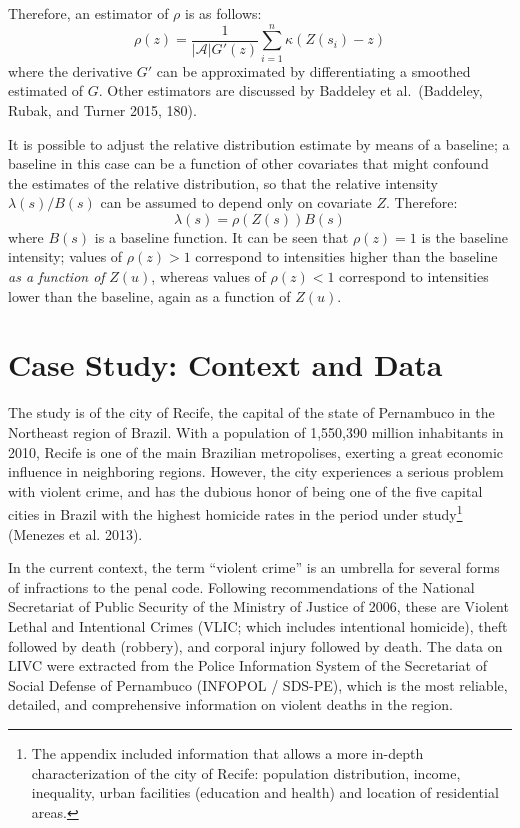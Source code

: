 \documentclass[smallextended]{svjour3}       %
\begin{document}
Therefore, an estimator of \(\rho\) is as follows: \[
\rho(z) = \frac{1}{|\mathcal{A}|G'(z)}\sum_{i=1}^n\kappa(Z(s_i) - z)
\] where the derivative \(G'\) can be approximated by differentiating a
smoothed estimated of \(G\). Other estimators are discussed by Baddeley
et al.~(Baddeley, Rubak, and Turner 2015, 180).

It is possible to adjust the relative distribution estimate by means of
a baseline; a baseline in this case can be a function of other
covariates that might confound the estimates of the relative
distribution, so that the relative intensity \(\lambda(s)/B(s)\) can be
assumed to depend only on covariate \(Z\). Therefore: \[
\lambda(s) = \rho(Z(s))B(s)
\] where \(B(s)\) is a baseline function. It can be seen that
\(\rho(z)=1\) is the baseline intensity; values of \(\rho(z)>1\)
correspond to intensities higher than the baseline \emph{as a function
of} \(Z(u)\), whereas values of \(\rho(z)<1\) correspond to intensities
lower than the baseline, again as a function of \(Z(u)\).

\hypertarget{case}{%
\section{Case Study: Context and Data}\label{case}}

The study is of the city of Recife, the capital of the state of
Pernambuco in the Northeast region of Brazil. With a population of
1,550,390 million inhabitants in 2010, Recife is one of the main
Brazilian metropolises, exerting a great economic influence in
neighboring regions. However, the city experiences a serious problem
with violent crime, and has the dubious honor of being one of the five
capital cities in Brazil with the highest homicide rates in the period
under
study\footnote{The appendix included information that allows a more in-depth characterization of the city of Recife: population distribution, income, inequality, urban facilities (education and health) and location of residential areas.}
(Menezes et al. 2013).

In the current context, the term ``violent crime'' is an umbrella for
several forms of infractions to the penal code. Following
recommendations of the National Secretariat of Public Security of the
Ministry of Justice of 2006, these are Violent Lethal and Intentional
Crimes (VLIC; which includes intentional homicide), theft followed by
death (robbery), and corporal injury followed by death. The data on LIVC
were extracted from the Police Information System of the Secretariat of
Social Defense of Pernambuco (INFOPOL / SDS-PE), which is the most
reliable, detailed, and comprehensive information on violent deaths in
the region.
\end{document}
